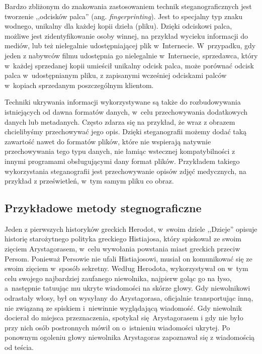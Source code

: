 \documentclass[a4paper, twoside, 12pt]{report}
\begin{document}
        Bardzo zbliżonym do znakowania zastosowaniem technik steganograficznych jest
        tworzenie ,,odcisków palca'' (ang. \emph{fingerprinting}). Jest to specjalny
        typ znaku wodnego, unikalny dla każdej kopii dzieła (pliku). Dzięki odciskowi
        palca, możliwe jest zidentyfikowanie osoby winnej, na przykład wycieku informacji
        do mediów, lub też nielegalnie udostępniającej plik w~Internecie. W~przypadku,
        gdy jeden z nabywców filmu udostępnia go nielegalnie w~Internecie, sprzedawca,
        który w~każdej sprzedanej kopii umieścił unikalny odcisk palca, może porównać
        odcisk palca w~udostępnianym pliku, z zapisanymi wcześniej odciskami palców
        w~kopiach sprzedanym poszczególnym klientom.

        Techniki ukrywania informacji wykorzystywane są także do rozbudowywania
        istniejących od dawna formatów danych, w~celu przechowywania dodatkowych
        danych lub metadanych. Często zdarza się na przykład, że wraz z obrazem
        chcielibyśmy przechowywać jego opis. Dzięki steganografii możemy dodać
        taką zawartość nawet do formatów plików, które nie wspierają natywnie
        przechowywania tego typu danych, nie łamiąc wstecznej kompatybilności z innymi
        programami obsługującymi dany format plików. Przykładem takiego wykorzystania
        steganografii jest przechowywanie opisów zdjęć medycznych, na przykład
        z prześwietleń, w~tym samym pliku co obraz\cite{DISAPPEARINGCRYPTOEMBEDDINGMETDATA}.

        \subsection{Przykładowe metody stegnograficzne}
        Jeden z pierwszych historyków greckich Herodot, w~swoim dziele ,,Dzieje''
        opisuje historię starożytnego polityka greckiego Histiajosa, który spiskował
        ze swoim zięciem Arystagorasem, w~celu wywołania powstania miast greckich
        przeciw Persom\cite{STEGANOGRAPHYINTRO}. Ponieważ Persowie nie ufali Histiajosowi, musiał on komunikować
        się ze swoim zięciem w~sposób sekretny. Według Herodota, wykorzystywał
        on w~tym celu swojego najbardziej zaufanego niewolnika, najpierw goląc
        go na łyso, a~następnie tatuując mu ukryte wiadomości na skórze głowy.
        Gdy niewolnikowi odrastały włosy, był on wysyłany do Arystagorasa, oficjalnie
        transportując inną, nie związaną ze spiskiem i~niewinnie wyglądającą wiadomość.
        Gdy niewolnik docierał do miejsca przeznaczenia, spotykał się Arystagorasem i
        gdy nie było przy nich osób postronnych mówił on o~istnieniu wiadomości ukrytej.
        Po ponownym ogoleniu głowy niewolnika Arystagoras zapoznawał się z wiadomością
        od teścia.
\end{document}
